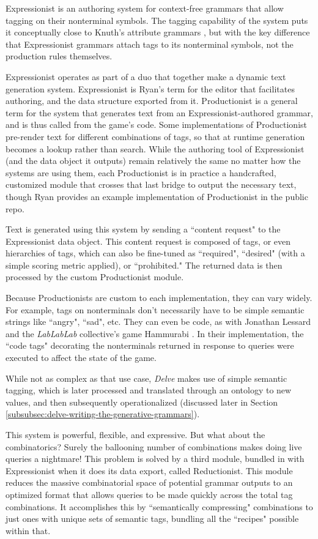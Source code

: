 Expressionist is an authoring system for context-free grammars \cite{bundy1984catalogue} that allow tagging on their nonterminal symbols. The tagging capability of the system puts it conceptually close to Knuth's attribute grammars \cite{knuth1968semantics}, but with the key difference that Expressionist grammars attach tags to its nonterminal symbols, not the production rules themselves.

Expressionist operates as part of a duo that together make a dynamic text generation system. Expressionist is Ryan's term for the editor that facilitates authoring, and the data structure exported from it. Productionist is a general term for the system that generates text from an Expressionist-authored grammar, and is thus called from the game’s code. Some implementations of Productionist pre-render text for different combinations of tags, so that at runtime generation becomes a lookup rather than search. While the authoring tool of Expressionist (and the data object it outputs) remain relatively the same no matter how the systems are using them, each Productionist is in practice a handcrafted, customized module that crosses that last bridge to output the necessary text, though Ryan provides an example implementation of Productionist in the public repo.

Text is generated using this system by sending a ``content request" to the Expressionist data object. This content request is composed of tags, or even hierarchies of tags, which can also be fine-tuned as ``required", ``desired" (with a simple scoring metric applied), or ``prohibited." The returned data is then processed by the custom Productionist module.

Because Productionists are custom to each implementation, they can vary widely. For example, tags on nonterminals don't necessarily have to be simple semantic strings like ``angry", ``sad", etc. They can even be code, as with Jonathan Lessard and the \textit{LabLabLab} collective's game Hammurabi \cite{lessard2017striving}. In their implementation, the ``code tags" decorating the nonterminals returned in response to queries were executed to affect the state of the game.

While not as complex as that use case, \textit{Delve} makes use of simple semantic tagging, which is later processed and translated through an ontology to new values, and then subsequently operationalized (discussed later in Section \ref{subsubsec:delve-writing-the-generative-grammars}).

This system is powerful, flexible, and expressive. But what about the combinatorics? Surely the ballooning number of combinations makes doing live queries a nightmare! This problem is solved by a third module, bundled in with Expressionist when it does its data export, called Reductionist. This module reduces the massive combinatorial space of potential grammar outputs to an optimized format that allows queries to be made quickly across the total tag combinations. It accomplishes this by ``semantically compressing" combinations to just ones with unique sets of semantic tags, bundling all the ``recipes" possible within that.

